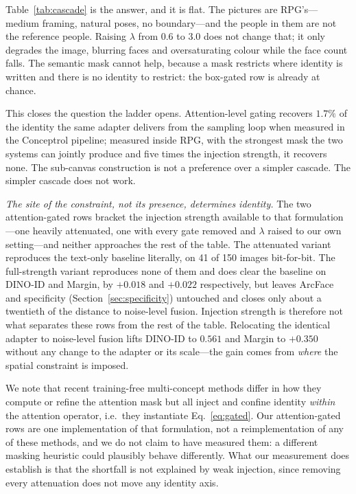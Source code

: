 \documentclass[10pt,twocolumn,letterpaper]{article}
\begin{document}
Table~\ref{tab:cascade} is the answer, and it is flat.  The pictures are
RPG's---medium framing, natural poses, no boundary---and the people in them
are not the reference people.  Raising $\lambda$ from $0.6$ to $3.0$ does not
change that; it only degrades the image, blurring faces and oversaturating
colour while the face count falls.  The semantic mask cannot help, because a
mask restricts where identity is written and there is no identity to restrict:
the box-gated row is already at chance.

This closes the question the ladder opens.  Attention-level gating recovers
$1.7\%$ of the identity the same adapter delivers from the sampling loop when
measured in the Conceptrol pipeline; measured inside RPG, with the strongest
mask the two systems can jointly produce and five times the injection
strength, it recovers none.  The sub-canvas construction is not a preference
over a simpler cascade.  The simpler cascade does not work.

\noindent\textit{The site of the constraint, not its presence,
determines identity.}
The two attention-gated rows bracket the injection strength available to
that formulation---one heavily attenuated, one with every gate removed
and $\lambda$ raised to our own setting---and neither approaches the rest
of the table.  The attenuated variant reproduces the text-only baseline
literally, on 41 of 150 images bit-for-bit.  The full-strength variant
reproduces none of them and does clear the baseline on DINO-ID and Margin,
by $+0.018$ and $+0.022$ respectively, but leaves ArcFace and specificity
(Section~\ref{sec:specificity}) untouched and closes only about a
twentieth of the distance to noise-level fusion.  Injection strength is
therefore not what separates these rows from the rest of the table.  Relocating the identical adapter to
noise-level fusion lifts DINO-ID to $0.561$ and Margin to $+0.350$
without any change to the adapter or its scale---the gain comes from
\emph{where} the spatial constraint is imposed.

We note that recent training-free multi-concept methods
\cite{he2025conceptrol,mc2_2025,latexblend2025,freecustom2024,yu2025anyms}
differ in how they compute or refine the attention mask but all inject
and confine identity \emph{within} the attention operator, i.e.\ they
instantiate Eq.~\ref{eq:gated}.  Our attention-gated rows are one
implementation of that formulation, not a reimplementation of any of
these methods, and we do not claim to have measured them: a different
masking heuristic could plausibly behave differently.  What our
measurement does establish is that the shortfall is not explained by
weak injection, since removing every attenuation does not move any
identity axis.
\end{document}

